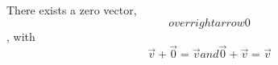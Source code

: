 \documentclass[preview]{standalone}
\begin{document}
\begin{center}
There exists a zero vector, \[overrightarrow{0}\], with \[\overrightarrow{v} + \overrightarrow{0} = \overrightarrow{v} and \overrightarrow{0} + \overrightarrow{v} = \overrightarrow{v}\]
\end{center}
\end{document}
